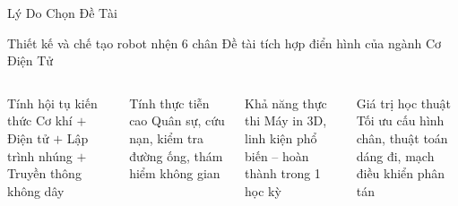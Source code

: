 \begin{frame}{Lý Do Chọn Đề Tài}
  \begin{block}{\centering Thiết kế và chế tạo robot nhện 6 chân}
    \centering Đề tài tích hợp điển hình của ngành Cơ Điện Tử
  \end{block}
  \vspace{0.2cm}
  \begin{columns}[T]
      \begin{exampleblock}{Tính hội tụ kiến thức}
        Cơ khí $+$ Điện tử $+$ Lập trình nhúng $+$ Truyền thông không dây
      \end{exampleblock}
      \vspace{0.15cm}
      \begin{exampleblock}{Tính thực tiễn cao}
        Quân sự, cứu nạn, kiểm tra đường ống, thám hiểm không gian
      \end{exampleblock}
      \begin{exampleblock}{Khả năng thực thi}
        Máy in 3D, linh kiện phổ biến -- hoàn thành trong 1 học kỳ
      \end{exampleblock}
      \vspace{0.15cm}
      \begin{exampleblock}{Giá trị học thuật}
        Tối ưu cấu hình chân, thuật toán dáng đi, mạch điều khiển phân tán
      \end{exampleblock}
  \end{columns}
\end{frame}
